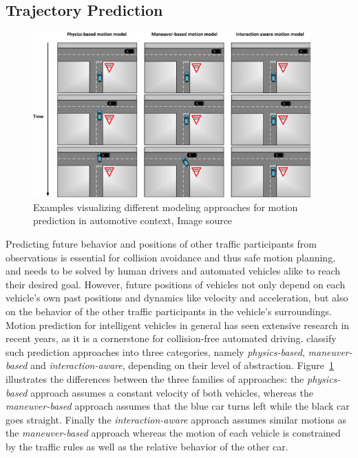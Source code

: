 \subsection{Trajectory Prediction}%
\label{subsec:trajectory_prediction}

\begin{figure}[t!]
	\centering
	\includegraphics[width=0.95\textwidth]{imgs/examples_motion_prediction_models.jpg}
	\caption{Examples visualizing different modeling approaches for motion prediction in automotive context, Image source \cite{Lefevre2014}}
	\label{fig:examples_motion_prediction_types}
\end{figure}
Predicting future behavior and positions of other traffic participants from observations is essential for collision avoidance and thus safe motion planning, and needs to be solved by human drivers and automated vehicles alike to reach their desired goal.
However, future positions of vehicles not only depend on each vehicle's own past positions and dynamics like  velocity and acceleration, but also on the behavior of the other traffic participants in the vehicle's surroundings.
Motion prediction for intelligent vehicles in general has seen extensive research in recent years, as it is a cornerstone for collision-free automated driving. \cite{Lefevre2014} classify such prediction approaches into three categories, namely \emph{physics-based}, \emph{maneuver-based} and \emph{interaction-aware}, depending on their level of abstraction.
Figure~\ref{fig:examples_motion_prediction_types} illustrates the differences between the three families of approaches: the \emph{physics-based} approach assumes a constant velocity of both vehicles, whereas the \emph{maneuver-based} approach assumes that the blue car turns left while the black car goes straight.
Finally the \emph{interaction-aware} approach assumes similar motions as the \emph{maneuver-based} approach whereas the motion of each vehicle is constrained by the traffic rules as well as the relative behavior of the other car.

